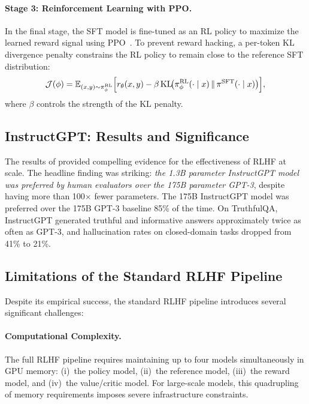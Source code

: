\documentclass[12pt,a4paper]{report}
\begin{document}
\paragraph{Stage 3: Reinforcement Learning with PPO.}
In the final stage, the SFT model is fine-tuned as an RL policy to maximize the learned reward signal using PPO~\cite{schulman2017ppo}. To prevent reward hacking, a per-token KL divergence penalty constrains the RL policy to remain close to the reference SFT distribution:
\begin{equation}
    \mathcal{J}(\phi) = \mathbb{E}_{(x, y) \sim \pi_\phi^{\text{RL}}} \Bigl[r_\theta(x, y) - \beta \, \text{KL}\!\bigl(\pi_\phi^{\text{RL}}(\cdot \mid x) \,\|\, \pi^{\text{SFT}}(\cdot \mid x)\bigr)\Bigr],
    \label{eq:rlhf_objective}
\end{equation}
where $\beta$ controls the strength of the KL penalty.

\subsection{InstructGPT: Results and Significance}

The results of \cite{ouyang2022instructgpt} provided compelling evidence for the effectiveness of RLHF at scale. The headline finding was striking: \emph{the 1.3B parameter InstructGPT model was preferred by human evaluators over the 175B parameter GPT-3}, despite having more than 100$\times$ fewer parameters. The 175B InstructGPT model was preferred over the 175B GPT-3 baseline 85\% of the time. On TruthfulQA, InstructGPT generated truthful and informative answers approximately twice as often as GPT-3, and hallucination rates on closed-domain tasks dropped from 41\% to 21\%.

\subsection{Limitations of the Standard RLHF Pipeline}

Despite its empirical success, the standard RLHF pipeline introduces several significant challenges:

\paragraph{Computational Complexity.}
The full RLHF pipeline requires maintaining up to four models simultaneously in GPU memory: (i)~the policy model, (ii)~the reference model, (iii)~the reward model, and (iv)~the value/critic model. For large-scale models, this quadrupling of memory requirements imposes severe infrastructure constraints.
\end{document}
